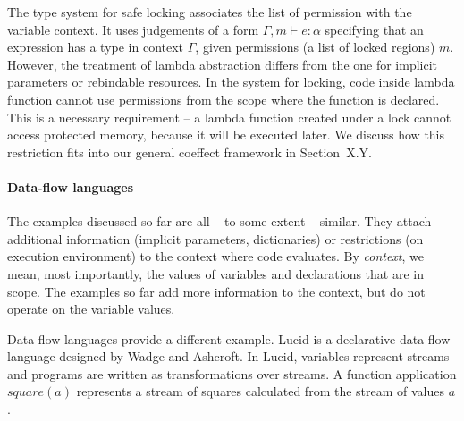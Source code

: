 The type system for safe locking associates the list of permission with the variable context.
It uses judgements of a form $\Gamma, m \vdash e : \alpha$ specifying that an expression has a
type in context $\Gamma$, given permissions (a list of locked regions) $m$. However, the treatment
of lambda abstraction differs from the one for implicit parameters or rebindable resources.
In the system for locking, code inside lambda function cannot use permissions from the scope
where the function is declared. This is a necessary requirement -- a lambda function created 
under a lock cannot access protected memory, because it will be executed later. We discuss how
this restriction fits into our general coeffect framework in Section~X.Y.

%
%


\paragraph{Data-flow languages}

The examples discussed so far are all -- to some extent -- similar. They attach additional 
information (implicit parameters, dictionaries) or restrictions (on execution environment) to the
context where code evaluates. By \emph{context}, we mean, most importantly, the values of variables
and declarations that are in scope. The examples so far add more information to the context, but
do not operate on the variable values.

Data-flow languages provide a different example. Lucid \cite{app-lucid} is a declarative data-flow 
language designed by Wadge and Ashcroft. In Lucid, variables represent streams and programs
are written as transformations over streams. A function application $\mathit{square}(a)$ represents
a stream of squares calculated from the stream of values $a$.

